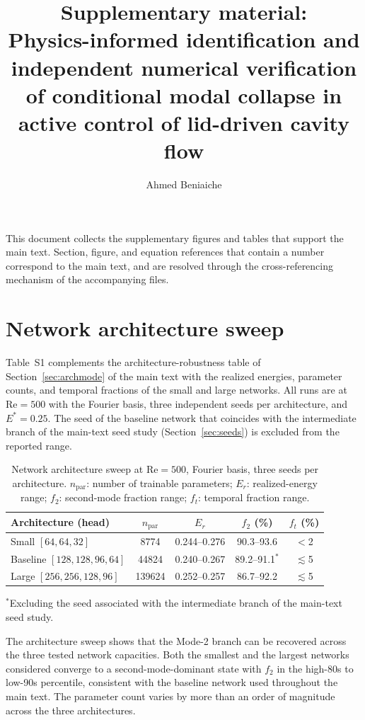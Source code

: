 \documentclass[11pt]{article}
\title{\large Supplementary material:\\ Physics-informed identification and independent numerical verification of conditional modal collapse in active control of lid-driven cavity flow}
\author{Ahmed Beniaiche}
\date{}
\newcommand{\re}{\mathrm{Re}}
\begin{document}
\maketitle

This document collects the supplementary figures and tables that support the main text. Section, figure, and equation references that contain a number correspond to the main text, and are resolved through the cross-referencing mechanism of the accompanying files.

\section{Network architecture sweep}\label{ssec:archtable}

Table~S1 complements the architecture-robustness table of Section~\ref{sec:archmode} of the main text with the realized energies, parameter counts, and temporal fractions of the small and large networks. All runs are at $\re=500$ with the Fourier basis, three independent seeds per architecture, and $E^*=0.25$. The seed of the baseline network that coincides with the intermediate branch of the main-text seed study (Section~\ref{sec:seeds}) is excluded from the reported range.

\begin{table}[ht]
\centering
\caption{Network architecture sweep at $\re=500$, Fourier basis, three seeds per architecture. $n_{\mathrm{par}}$: number of trainable parameters; $E_r$: realized-energy range; $f_2$: second-mode fraction range; $f_t$: temporal fraction range.}
\label{tab:s1}
\begin{tabular}{lcccc}
\toprule
Architecture (head) & $n_{\mathrm{par}}$ & $E_r$ & $f_2$ (\%) & $f_t$ (\%) \\
\midrule
Small $[64,64,32]$        & 8774    & 0.244--0.276 & 90.3--93.6 & $<$2 \\
Baseline $[128,128,96,64]$ & 44824   & 0.240--0.267 & 89.2--91.1$^{*}$ & $\lesssim$5 \\
Large $[256,256,128,96]$  & 139624  & 0.252--0.257 & 86.7--92.2 & $\lesssim$5 \\
\bottomrule
\end{tabular}
\end{table}

$^{*}$Excluding the seed associated with the intermediate branch of the main-text seed study.

The architecture sweep shows that the Mode-2 branch can be recovered across the three tested network capacities. Both the smallest and the largest networks considered converge to a second-mode-dominant state with $f_2$ in the high-80s to low-90s percentile, consistent with the baseline network used throughout the main text. The parameter count varies by more than an order of magnitude across the three architectures.
\end{document}
